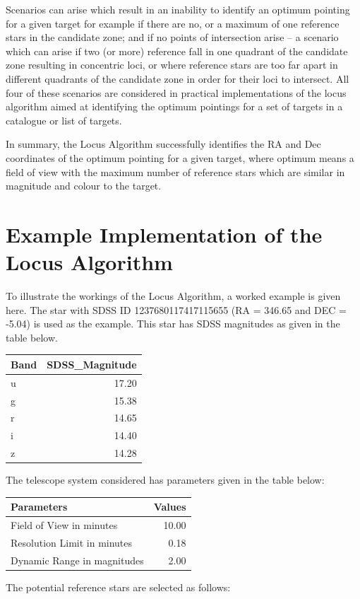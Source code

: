 \documentclass[]{elsarticle} %
\begin{document}
Scenarios can arise which result in an inability to identify an optimum
pointing for a given target for example if there are no, or a maximum of
one reference stars in the candidate zone; and if no points of
intersection arise -- a scenario which can arise if two (or more)
reference fall in one quadrant of the candidate zone resulting in
concentric loci, or where reference stars are too far apart in different
quadrants of the candidate zone in order for their loci to intersect.
All four of these scenarios are considered in practical implementations
of the locus algorithm aimed at identifying the optimum pointings for a
set of targets in a catalogue or list of targets.

In summary, the Locus Algorithm successfully identifies the RA and Dec
coordinates of the optimum pointing for a given target, where optimum
means a field of view with the maximum number of reference stars which
are similar in magnitude and colour to the target.

\newpage

\hypertarget{example-implementation-of-the-locus-algorithm}{%
\section{Example Implementation of the Locus
Algorithm}\label{example-implementation-of-the-locus-algorithm}}

To illustrate the workings of the Locus Algorithm, a worked example is
given here. The star with SDSS ID 1237680117417115655 (RA = 346.65 and
DEC = -5.04) is used as the example. This star has SDSS magnitudes as
given in the table below.

\begin{longtable}[]{@{}lr@{}}
\toprule
Band & SDSS\_Magnitude\tabularnewline
\midrule
\endhead
u & 17.20\tabularnewline
g & 15.38\tabularnewline
r & 14.65\tabularnewline
i & 14.40\tabularnewline
z & 14.28\tabularnewline
\bottomrule
\end{longtable}

The telescope system considered has parameters given in the table below:

\begin{longtable}[]{@{}lr@{}}
\toprule
Parameters & Values\tabularnewline
\midrule
\endhead
Field of View in minutes & 10.00\tabularnewline
Resolution Limit in minutes & 0.18\tabularnewline
Dynamic Range in magnitudes & 2.00\tabularnewline
\bottomrule
\end{longtable}

The potential reference stars are selected as follows:
\end{document}
